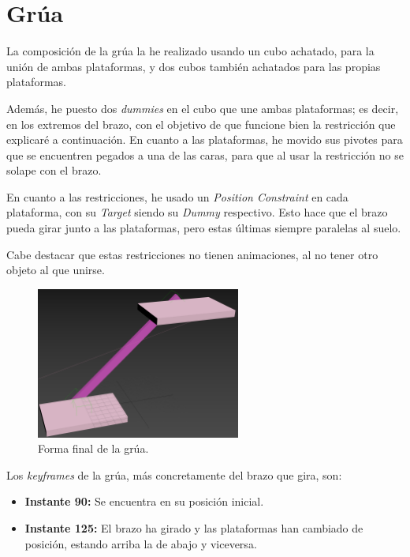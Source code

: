 \section{Grúa}

La composición de la grúa la he realizado usando un cubo achatado, para la unión de ambas plataformas, y dos cubos también achatados para las propias plataformas.

\bigskip

Además, he puesto dos \textit{dummies} en el cubo que une ambas plataformas; es decir, en los extremos del brazo, con el objetivo de que funcione bien la restricción que explicaré a continuación. En cuanto a las plataformas, he movido sus pivotes para que se encuentren pegados a una de las caras, para que al usar la restricción no se solape con el brazo.

\bigskip

En cuanto a las restricciones, he usado un \textit{Position Constraint} en cada plataforma, con su \textit{Target} siendo su \textit{Dummy} respectivo. Esto hace que el brazo pueda girar junto a las plataformas, pero estas últimas siempre paralelas al suelo.

\bigskip

Cabe destacar que estas restricciones no tienen animaciones, al no tener otro objeto al que unirse.

\begin{figure}[H]
    \centering
    \includegraphics[width=0.6\textwidth]{imagenes/grua/grua.png}
    \caption{Forma final de la grúa.}
 \end{figure}

Los \textit{keyframes} de la grúa, más concretamente del brazo que gira, son:

\begin{itemize}
    \item \textbf{Instante 90: }Se encuentra en su posición inicial.
    \item \textbf{Instante 125: }El brazo ha girado y las plataformas han cambiado de posición, estando arriba la de abajo y viceversa.
\end{itemize}

